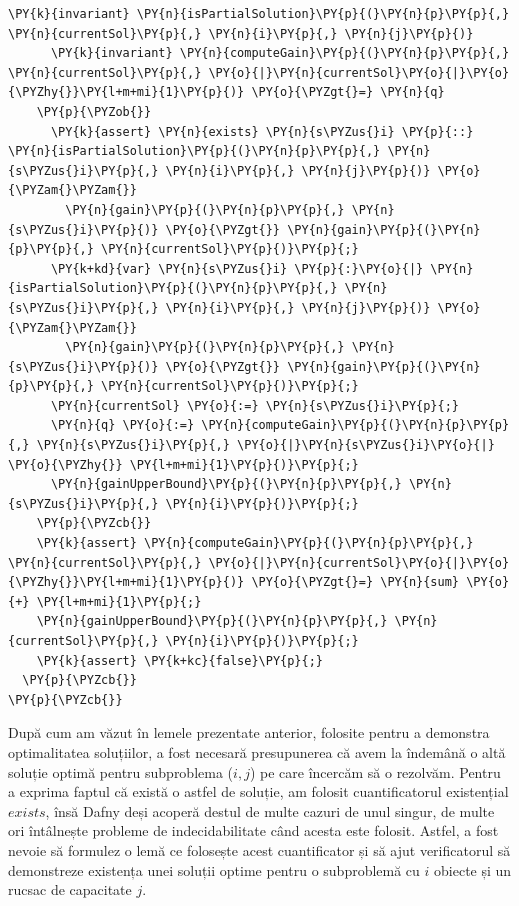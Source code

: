 \begin{sloppypar}
\begin{enumerate}
\begin{Verbatim}[commandchars=\\\{\}]
      \PY{k}{invariant} \PY{n}{isPartialSolution}\PY{p}{(}\PY{n}{p}\PY{p}{,} \PY{n}{currentSol}\PY{p}{,} \PY{n}{i}\PY{p}{,} \PY{n}{j}\PY{p}{)}
      \PY{k}{invariant} \PY{n}{computeGain}\PY{p}{(}\PY{n}{p}\PY{p}{,} \PY{n}{currentSol}\PY{p}{,} \PY{o}{|}\PY{n}{currentSol}\PY{o}{|}\PY{o}{\PYZhy{}}\PY{l+m+mi}{1}\PY{p}{)} \PY{o}{\PYZgt{}=} \PY{n}{q}
    \PY{p}{\PYZob{}}
      \PY{k}{assert} \PY{n}{exists} \PY{n}{s\PYZus{}i} \PY{p}{::} \PY{n}{isPartialSolution}\PY{p}{(}\PY{n}{p}\PY{p}{,} \PY{n}{s\PYZus{}i}\PY{p}{,} \PY{n}{i}\PY{p}{,} \PY{n}{j}\PY{p}{)} \PY{o}{\PYZam{}\PYZam{}} 
        \PY{n}{gain}\PY{p}{(}\PY{n}{p}\PY{p}{,} \PY{n}{s\PYZus{}i}\PY{p}{)} \PY{o}{\PYZgt{}} \PY{n}{gain}\PY{p}{(}\PY{n}{p}\PY{p}{,} \PY{n}{currentSol}\PY{p}{)}\PY{p}{;}
      \PY{k+kd}{var} \PY{n}{s\PYZus{}i} \PY{p}{:}\PY{o}{|} \PY{n}{isPartialSolution}\PY{p}{(}\PY{n}{p}\PY{p}{,} \PY{n}{s\PYZus{}i}\PY{p}{,} \PY{n}{i}\PY{p}{,} \PY{n}{j}\PY{p}{)} \PY{o}{\PYZam{}\PYZam{}} 
        \PY{n}{gain}\PY{p}{(}\PY{n}{p}\PY{p}{,} \PY{n}{s\PYZus{}i}\PY{p}{)} \PY{o}{\PYZgt{}} \PY{n}{gain}\PY{p}{(}\PY{n}{p}\PY{p}{,} \PY{n}{currentSol}\PY{p}{)}\PY{p}{;}
      \PY{n}{currentSol} \PY{o}{:=} \PY{n}{s\PYZus{}i}\PY{p}{;}
      \PY{n}{q} \PY{o}{:=} \PY{n}{computeGain}\PY{p}{(}\PY{n}{p}\PY{p}{,} \PY{n}{s\PYZus{}i}\PY{p}{,} \PY{o}{|}\PY{n}{s\PYZus{}i}\PY{o}{|} \PY{o}{\PYZhy{}} \PY{l+m+mi}{1}\PY{p}{)}\PY{p}{;}
      \PY{n}{gainUpperBound}\PY{p}{(}\PY{n}{p}\PY{p}{,} \PY{n}{s\PYZus{}i}\PY{p}{,} \PY{n}{i}\PY{p}{)}\PY{p}{;}
    \PY{p}{\PYZcb{}}
    \PY{k}{assert} \PY{n}{computeGain}\PY{p}{(}\PY{n}{p}\PY{p}{,} \PY{n}{currentSol}\PY{p}{,} \PY{o}{|}\PY{n}{currentSol}\PY{o}{|}\PY{o}{\PYZhy{}}\PY{l+m+mi}{1}\PY{p}{)} \PY{o}{\PYZgt{}=} \PY{n}{sum} \PY{o}{+} \PY{l+m+mi}{1}\PY{p}{;}
    \PY{n}{gainUpperBound}\PY{p}{(}\PY{n}{p}\PY{p}{,} \PY{n}{currentSol}\PY{p}{,} \PY{n}{i}\PY{p}{)}\PY{p}{;}
    \PY{k}{assert} \PY{k+kc}{false}\PY{p}{;}
  \PY{p}{\PYZcb{}}
\PY{p}{\PYZcb{}}
\end{Verbatim}
    După cum am văzut în lemele prezentate anterior, folosite pentru a demonstra optimalitatea soluțiilor, a fost necesară presupunerea că avem la îndemână o altă soluție optimă pentru subproblema ($i, j$) pe care încercăm să o rezolvăm. Pentru a exprima faptul că există o astfel de soluție, am folosit cuantificatorul existențial $exists$, însă Dafny deși acoperă destul de multe cazuri de unul singur, de multe ori întâlnește probleme de indecidabilitate când acesta este folosit. Astfel, a fost nevoie să formulez o lemă ce folosește acest cuantificator și să ajut verificatorul să demonstreze existența unei soluții optime pentru o subproblemă cu $i$ obiecte și un rucsac de capacitate $j$. \par

\end{enumerate}
\end{sloppypar}
